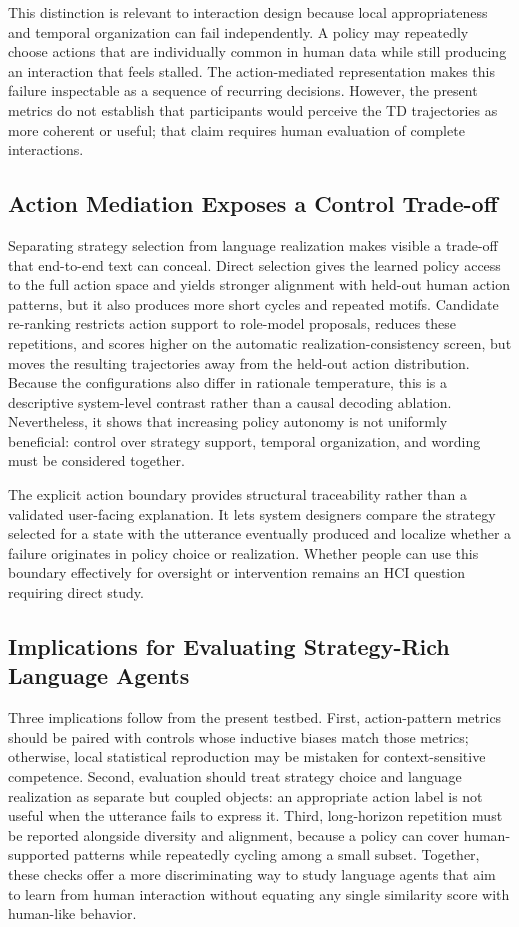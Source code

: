 \documentclass[manuscript,review,anonymous]{acmart}
\begin{document}
This distinction is relevant to interaction design because local
appropriateness and temporal organization can fail independently. A policy
may repeatedly choose actions that are individually common in human data while
still producing an interaction that feels stalled. The action-mediated
representation makes this failure inspectable as a sequence of recurring
decisions. However, the present metrics do not establish that participants
would perceive the TD trajectories as more coherent or useful; that claim
requires human evaluation of complete interactions.

\subsection{Action Mediation Exposes a Control Trade-off}

Separating strategy selection from language realization makes visible a
trade-off that end-to-end text can conceal. Direct selection gives the learned
policy access to the full action space and yields stronger alignment with
held-out human action patterns, but it also produces more short cycles and
repeated motifs. Candidate re-ranking restricts action support to role-model
proposals, reduces these repetitions, and scores higher on the automatic
realization-consistency screen, but moves the resulting trajectories away from
the held-out action distribution. Because the configurations also differ in
rationale temperature, this is a descriptive system-level contrast rather
than a causal decoding ablation. Nevertheless, it shows that increasing policy
autonomy is not uniformly beneficial: control over strategy support, temporal
organization, and wording must be considered together.

The explicit action boundary provides structural traceability rather than a
validated user-facing explanation. It lets system designers compare the
strategy selected for a state with the utterance eventually produced and
localize whether a failure originates in policy choice or realization. Whether
people can use this boundary effectively for oversight or intervention remains
an HCI question requiring direct study.

\subsection{Implications for Evaluating Strategy-Rich Language Agents}

Three implications follow from the present testbed. First, action-pattern
metrics should be paired with controls whose inductive biases match those
metrics; otherwise, local statistical reproduction may be mistaken for
context-sensitive competence. Second, evaluation should treat strategy choice
and language realization as separate but coupled objects: an appropriate
action label is not useful when the utterance fails to express it. Third,
long-horizon repetition must be reported alongside diversity and alignment,
because a policy can cover human-supported patterns while repeatedly cycling
among a small subset. Together, these checks offer a more discriminating way
to study language agents that aim to learn from human interaction without
equating any single similarity score with human-like behavior.
\end{document}
